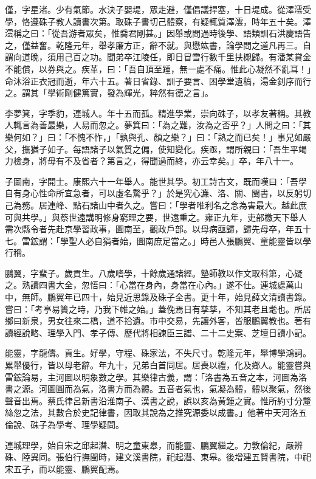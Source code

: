 \begin{pinyinscope}
僅，字星渚。少有氣節。水決子嬰堤，眾走避，僅倡議捍塞，十日堤成。從澤澐受學，恪遵硃子教人讀書次第。取硃子書切己體察，有疑輒質澤澐，時年五十矣。澤澐稱之曰：「從吾游者眾矣，惟喬君剛甚。」因舉或問過時後學、語類訓石洪慶語告之，僅益奮。乾隆元年，舉孝廉方正，辭不就。與懋竑書，論學問之道凡再三。自謂向道晚，須用己百之功。聞弟卒江陵任，即日冒雪行數千里扶櫬歸。有潘某貸金不能償，以券與之。疾革，曰：「吾自頂至踵，無一處不痛。惟此心凝然不亂耳！」命沐浴正衣冠而逝，年六十五。著日省錄、訓子要言、困學堂遺稿，湯金釗序而行之。謂其「學術剛健篤實，發為輝光，粹然有德之言」。

李夢箕，字季豹，連城人。年十五而孤。精進學業，崇向硃子，以孝友著稱。其教人輒言為善最樂，人易而忽之。夢箕曰：「為之難，汝為之否乎？」人問之曰：「其樂何如？」曰：「不愧不怍，」「孰與孔、顏之樂？」曰：「熟之而已矣！」事兄如嚴父，撫猶子如子。每語諸子以氣質之偏，使知變化。疾亟，謂所親曰：「吾生平竭力檢身，將毋有不及省者？第言之，得聞過而終，亦云幸矣。」卒，年八十一。

子圖南，字開士。康熙六十一年舉人。能世其學。初工詩古文，既而嘆曰：「吾學自有身心性命所宜急者，可以虛名騖乎？」於是究心濂、洛、關、閩書，以反躬切己為務。居連峰、點石諸山中者久之。嘗曰：「學者唯利名之念為害最大。越此庶可與共學。」與蔡世遠講明修身窮理之要，世遠重之。雍正九年，吏部檄天下舉人需次縣令者先赴京學習政事，圖南至，觀政戶部。以母病亟歸，歸先母卒，年五十七。雷鋐謂：「學聖人必自狷者始，圖南庶足當之。」時邑人張鵬翼、童能靈皆以學行稱。

鵬翼，字蜚子。歲貢生。八歲嗜學，十餘歲通諸經。塾師教以作文取科第，心疑之。熟讀四書大全，忽悟曰：「心當在身內，身當在心內。」遂不仕。連城處萬山中，無師。鵬翼年已四十，始見近思錄及硃子全書。更十年，始見薛文清讀書錄。嘗曰：「考亭易簀之時，乃我下帷之始。」蓋俛焉日有孳孳，不知其老且耄也。所居鄉曰新泉，男女往來二橋，道不拾遺。巿中交易，先讓外客，皆服鵬翼教也。著有讀經說略、理學入門、孝子傳、歷代將相諫臣三譜、二十二史案、芝壇日讀小記。

能靈，字龍儔。貢生。好學，守程、硃家法，不失尺寸。乾隆元年，舉博學鴻詞。累舉優行，皆以母老辭。年九十，兄弟白首同居。居喪以禮，化及鄉人。能靈嘗與雷鋐論易，主河圖以明象數之學。其樂律古義，謂：「洛書為五音之本，河圖為洛書之源。河圖圓而為氣，洛書方而為體。五音者氣也，氣凝為體，體以聚氣，然後聲音出焉。蔡氏律呂新書沿淮南子、漢書之說，誤以亥為黃鍾之實。惟所約寸分釐絲忽之法，其數合於史記律書，因取其說為之推究源委以成書。」他著中天河洛五倫說、硃子為學考、理學疑問。

連城理學，始自宋之邱起潛、明之童東皋，而能靈、鵬翼繼之。力敦倫紀，嚴辨硃、陸異同。張伯行撫閩時，建文溪書院，祀起潛、東皋。後增建五賢書院，中祀宋五子，而以能靈、鵬翼配焉。


\end{pinyinscope}
